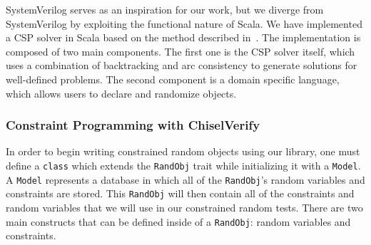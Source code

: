 \documentclass[conference]{IEEEtran}
\newcommand{\code}[1]{{\small{\texttt{#1}}}}
\begin{document}
%


SystemVerilog serves as an inspiration for our work, but we diverge from SystemVerilog by exploiting the functional nature of Scala. We have implemented a CSP solver in Scala based on the method described in~\cite{russell2002artificial}. The implementation is composed of two main components. The first one is the CSP solver itself, which uses a combination of backtracking and arc consistency to generate solutions for well-defined problems. The second component is a domain specific language, which allows users to declare and randomize objects.

\subsubsection{Constraint Programming with ChiselVerify}
In order to begin writing constrained random objects using our library, one must define a \texttt{class} which extends the \texttt{RandObj} trait while initializing it with a \texttt{Model}. A \texttt{Model} represents a database in which all of the \texttt{RandObj}'s random variables and constraints are stored. This \texttt{RandObj} will then contain all of the constraints and random variables that we will use in our constrained random tests. There are two main constructs that can be defined inside of a \texttt{RandObj}: random variables and constraints.
\end{document}
